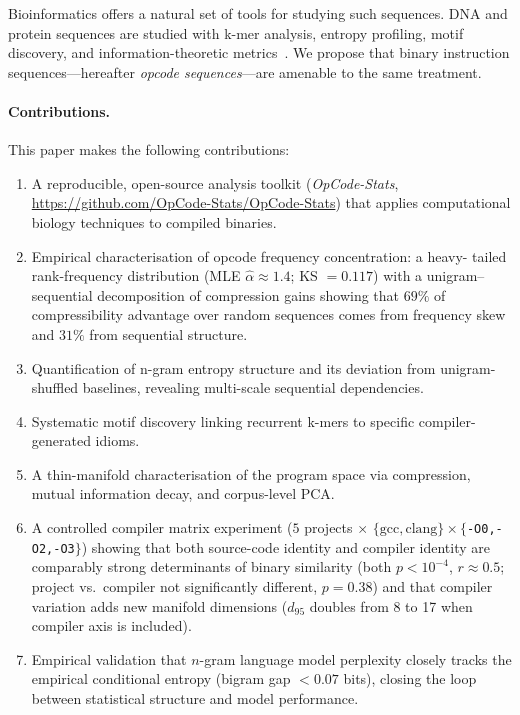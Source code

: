 \documentclass[10pt,twocolumn]{article}
\begin{document}
Bioinformatics offers a natural set of tools for studying such sequences.  DNA
and protein sequences are studied with k-mer analysis, entropy profiling,
motif discovery, and information-theoretic metrics~\cite{vinga2003alignment}.
We propose that binary instruction sequences---hereafter \emph{opcode
sequences}---are amenable to the same treatment.

\paragraph{Contributions.}  This paper makes the following contributions:
\begin{enumerate}
  \item A reproducible, open-source analysis toolkit (\emph{OpCode-Stats},
        \url{https://github.com/OpCode-Stats/OpCode-Stats}) that applies computational
        biology techniques to compiled binaries.
  \item Empirical characterisation of opcode frequency concentration: a heavy-
        tailed rank-frequency distribution (MLE $\hat{\alpha}\!\approx\!1.4$;
        KS $= 0.117$) with a unigram--sequential decomposition of compression
        gains showing that $69\%$ of compressibility advantage over random
        sequences comes from frequency skew and $31\%$ from sequential
        structure.
  \item Quantification of n-gram entropy structure and its deviation from
        unigram-shuffled baselines, revealing multi-scale sequential
        dependencies.
  \item Systematic motif discovery linking recurrent k-mers to specific
        compiler-generated idioms.
  \item A thin-manifold characterisation of the program space via compression,
        mutual information decay, and corpus-level PCA.
  \item A controlled compiler matrix experiment ($5$ projects $\times$
        $\{\text{gcc},\text{clang}\} \times \{$\texttt{-O0,-O2,-O3}$\}$) showing
        that both source-code identity and compiler identity are comparably
        strong determinants of binary similarity (both $p < 10^{-4}$,
        $r \approx 0.5$; project vs.\ compiler not significantly different,
        $p = 0.38$) and that compiler variation adds new manifold dimensions
        ($d_{95}$ doubles from 8 to 17 when compiler axis is included).
  \item Empirical validation that $n$-gram language model perplexity closely
        tracks the empirical conditional entropy (bigram gap $< 0.07$ bits),
        closing the loop between statistical structure and model performance.
\end{enumerate}
\end{document}
